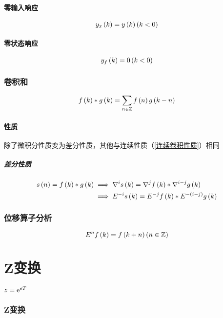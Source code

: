 \documentclass{article}
\begin{document}
\subsection{零输入响应}

\[y_x\left(k\right)=y\left(k\right)\left(k<0\right)\]

\subsection{零状态响应}

\[y_f\left(k\right)=0\left(k<0\right)\]

\section{卷积和}

\[f\left(k\right)\ast g\left(k\right)=\sum_{n\in\mathbb Z} f\left(n\right)g\left(k-n\right)\]

\subsection{性质}

除了微积分性质变为差分性质，其他与连续性质（\ref{连续卷积性质}）相同

\subsubsection{差分性质}

\[\begin{aligned}
        s\left(n\right)=f\left(k\right)\ast g\left(k\right) & \implies\nabla^is\left(k\right)=\nabla^jf\left(k\right)\ast\nabla^{i-j}g\left(k\right)  \\
                                          & \implies E^{-i}s\left(k\right)=E^{-j}f\left(k\right)\ast E^{-\left(i-j\right)}g\left(k\right)
    \end{aligned}\]

\section{位移算子分析}

\[E^nf\left(k\right)=f\left(k+n\right)\left(n\in\mathbb Z\right)\]

\part{Z变换}

$z=\mathrm e^{sT}$

\section{Z变换}
\end{document}
